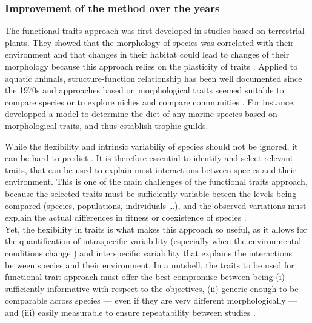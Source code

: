 \subsubsection{Improvement of the method over the years}
The functional-traits approach was first developed in studies based on terrestrial plants. They showed that the morphology of species was correlated with their environment and that changes in their habitat could lead to changes of their morphology because this approach relies on the plasticity of traits \citep{boissezon2014,lavorel1997,martini2020}. Applied to aquatic animals, structure-function relationship has been well documented since the 1970s \citep{gosline1971, lagler1977, webb1984} and approaches based on morphological traits  seemed suitable to compare species \citep{norton1995} or to explore niches and compare communities \citep{winemiller1991}. For instance, \citet{albouy2011} developped a model to determine the diet of any marine species based on morphological traits, and thus establish trophic guilds. 

While the flexibility and intrinsic variabiliy of species should not be ignored, it can be hard to predict \citep{diderich2006,martini2020}. It is therefore essential to identify and select relevant traits, that can be used to explain most interactions between species and their environment. This is one of the main challenges of the functional traits approach, because the selected traits must be sufficiently variable beteen the levels being compared (species, populations, individuals …), and the observed variations must explain the actual differences in fitness or coexistence of species \citep{kremer2017}. \\

Yet, the flexibility in traits is what makes this approach so useful, as it allows for the quantification of intraspecific variability (especially when the environmental conditions change \citet{martini2020}) and interspecific variability that explains the interactions between species and their environment. In a nutshell, the traits to be used for functional trait approach must offer the best compromise between being (i) sufficiently informative with respect to the objectives, (ii) generic enough to be comparable across species --- even if they are very different morphologically --- and (iii) easily measurable to ensure repeatability between studies \citep{dumay2004, kremer2017}.

